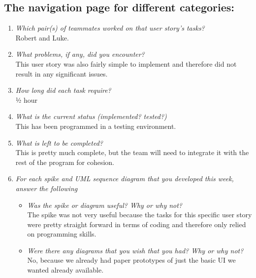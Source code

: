 \documentclass[12pt, letterpaper]{article}
\begin{document}
\subsection{The navigation page for different categories:}
\begin{enumerate}
	\item \emph{Which pair(s) of teammates worked on that user story's tasks?}
	\\Robert and Luke.
	\item \emph{What problems, if any, did you encounter?}
	\\This user story was also fairly simple to implement and therefore did not result in any significant issues.
	\item \emph{How long did each task require?}
	\\½ hour
	\item \emph{What is the current status (implemented? tested?)}
	\\This has been programmed in a testing environment. 
	\item \emph{What is left to be completed?}
	\\This is pretty much complete, but the team will need to integrate it with the rest of the program for cohesion.
	\item \emph{For each spike and UML sequence diagram that you developed this week, answer the following}
	\begin{itemize}
		\item \emph{Was the spike or diagram useful? Why or why not?}
		\\The spike was not very useful because the tasks for this specific user story were pretty straight forward in terms of coding and therefore only relied on programming skills.
		\item \emph{Were there any diagrams that you wish that you had? Why or why not?}
		\\No, because we already had paper prototypes of just the basic UI we wanted already available.
	\end{itemize}
\end{enumerate}
\end{document}
